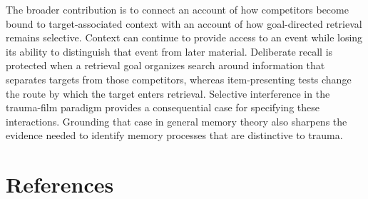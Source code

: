 \documentclass[
  man,
  floatsintext,
  longtable,
  nolmodern,
  notxfonts,
  notimes,
  draftfirst,
  colorlinks=true,linkcolor=blue,citecolor=blue,urlcolor=blue]{apa7}
\begin{document}
The broader contribution is to connect an account of how competitors
become bound to target-associated context with an account of how
goal-directed retrieval remains selective. Context can continue to
provide access to an event while losing its ability to distinguish that
event from later material. Deliberate recall is protected when a
retrieval goal organizes search around information that separates
targets from those competitors, whereas item-presenting tests change the
route by which the target enters retrieval. Selective interference in
the trauma-film paradigm provides a consequential case for specifying
these interactions. Grounding that case in general memory theory also
sharpens the evidence needed to identify memory processes that are
distinctive to trauma.

\section{References}\label{references}
\end{document}
